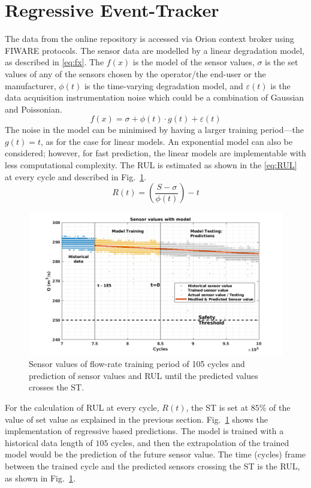 \documentclass[conference]{IEEEtran}
\begin{document}
\section{Regressive Event-Tracker}
\label{sec:RET}
The data from the online repository is accessed via Orion context broker using FIWARE protocols. The sensor data are modelled by a linear degradation model, as described in \eqref{eq:fx}. The $f(x)$ is the model of the sensor values, $\sigma$ is the set values of any of the sensors chosen by the operator/the end-user or the manufacturer, $\phi(t)$ is the time-varying degradation model, and $\varepsilon(t)$ is the data acquisition instrumentation noise which could be a combination of Gaussian and Poissonian.
\begin{equation}
    f(x) = \sigma + \phi(t)\cdot g(t) + \varepsilon(t)
    \label{eq:fx}
\end{equation}
The noise in the model can be minimised by having a larger training period—the $g(t)=t$, as for the case for linear models. An exponential model can also be considered; however, for fast prediction, the linear models are implementable with less computational complexity. The RUL is estimated as shown in the \eqref{eq:RUL} at every cycle and described in Fig.~\ref{fig:Model}.
\begin{equation}
    R(t) = \left(\frac{S-\sigma}{\phi(t)}\right)-t
    \label{eq:RUL}
\end{equation}
\begin{figure}[tbp]
\centerline{\includegraphics[width=\linewidth]{Model.png}}
\caption{Sensor values of flow-rate training period of 105 cycles and prediction of sensor values and RUL until the predicted values crosses the ST.}
\label{fig:Model}
\end{figure}
For the calculation of RUL at every cycle, $R(t)$, the ST is set at $85\%$ of the value of set value as explained in the previous section. Fig.~\ref{fig:Model} shows the implementation of regressive based predictions. The model is trained with a historical data length of $105$ cycles, and then the extrapolation of the trained model would be the prediction of the future sensor value. The time (cycles) frame between the trained cycle and the predicted sensors crossing the ST is the RUL, as shown in Fig.~\ref{fig:Model}.
\end{document}
